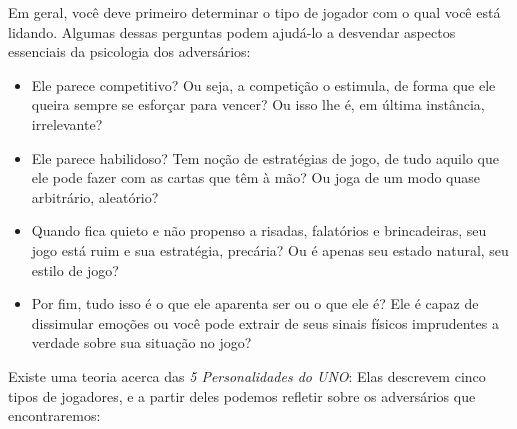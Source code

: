 Em geral, você deve primeiro determinar o tipo de jogador com o qual você está lidando. Algumas dessas perguntas podem ajudá-lo a desvendar aspectos essenciais da psicologia dos adversários:

\begin{itemize}
\item{Ele parece competitivo? Ou seja, a competição o estimula, de forma que ele queira sempre se esforçar para vencer? Ou isso lhe é, em última instância, irrelevante?}
\item{Ele parece habilidoso? Tem noção de estratégias de jogo, de tudo aquilo que ele pode fazer com as cartas que têm à mão? Ou joga de um modo quase arbitrário, aleatório?}
\item{Quando fica quieto e não propenso a risadas, falatórios e brincadeiras, seu jogo está ruim e sua estratégia, precária? Ou é apenas seu estado natural, seu estilo de jogo?}
\item{Por fim, tudo isso é o que ele aparenta ser ou o que ele é? Ele é capaz de dissimular emoções ou você pode extrair de seus sinais físicos imprudentes a verdade sobre sua situação no jogo?}
\end{itemize} 

Existe uma teoria acerca das \textit{5 Personalidades do UNO}: Elas descrevem cinco tipos de jogadores, e a partir deles podemos refletir sobre os adversários que encontraremos:

